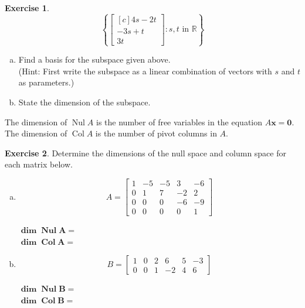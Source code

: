 \documentclass[10pt]{book}
\newcommand{\boxcolor}{gray!30}
\newenvironment{boxme}{\begin{mdframed}[backgroundcolor=\boxcolor,linewidth=0pt,nobreak=true]}{\end{mdframed}}
\theoremstyle{definition}
\newtheorem{exercise}{Exercise}[section]
\newcommand{\R}{\mathbb{R}}
\newcommand{\vect}[1]{\ensuremath{\boldsymbol{\mathbf{#1}}}}
\DeclareMathOperator{\Nul}{Nul}
\DeclareMathOperator{\Col}{Col}
\newcommand{\Axz}{A\vect{x}=\vect{0}}
\begin{document}
\begin{exercise} %
	$$\left\{ \begin{bmatrix}[c] 4s - 2t \\ -3s + t \\ 3t \end{bmatrix} : s,t \text{ in } \R \right\}$$
	\begin{enumerate}[(a)]
		\item Find a basis for the subspace given above. \\
		(Hint: First write the subspace as a linear combination of vectors with $s$ and $t$ as parameters.)
		\vfill
		\item State the dimension of the subspace.
		\vspace{2em}
	\end{enumerate}
\end{exercise}


\begin{boxme}
	The dimension of $\Nul A$ is the number of free variables in the equation $\Axz$. \\
	The dimension of $\Col A$ is the number of pivot columns in $A$.
\end{boxme}


\begin{exercise} %
	Determine the dimensions of the null space and column space for each matrix below.
	\begin{multicols}{2}
	\begin{enumerate}[(a)]
		\item $$A=\begin{bmatrix}1&-5&-5&3&-6\\0&1&7&-2&2\\0&0&0&-6&-9\\0&0&0&0&1\end{bmatrix}$$
		\vspace{2em}
		
		$\boldsymbol{\dim\Nul A=}$ \\[1em]
		$\boldsymbol{\dim\Col A=}$
		
		\columnbreak
		
		\item $$B=\begin{bmatrix}1&0&2&6&5&-3\\0&0&1&-2&4&6\end{bmatrix}$$
		\vspace{2em}
		
		$\boldsymbol{\dim\Nul B=}$ \\[1em]
		$\boldsymbol{\dim\Col B=}$
	\end{enumerate}
	\end{multicols}
\end{exercise}
\vspace{1in}
\end{document}
